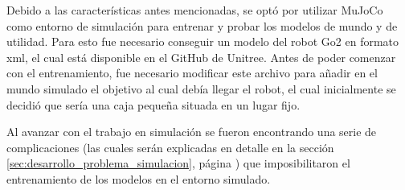 Debido a las características antes mencionadas, se optó por utilizar MuJoCo como entorno de simulación para entrenar y probar los modelos de mundo y de utilidad. 
Para esto fue necesario conseguir un modelo del robot Go2 en formato \Gls{xml}, el cual está disponible en el GitHub de Unitree\cite{UnitreeGo2XML}. 
Antes de poder comenzar con el entrenamiento, fue necesario modificar este archivo para añadir en el mundo simulado el objetivo al cual debía llegar el robot, 
el cual inicialmente se decidió que sería una caja pequeña situada en un lugar fijo.

Al avanzar con el trabajo en simulación se fueron encontrando una serie de complicaciones (las cuales serán explicadas en detalle en la sección \ref{sec:desarrollo_problema_simulacion}, 
página \pageref{sec:desarrollo_problema_simulacion}) que imposibilitaron el entrenamiento de los modelos en el entorno simulado.
